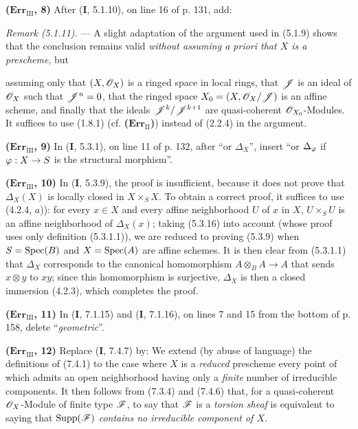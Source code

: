 \noindent\textbf{($\mathbf{Err}_{\mathrm{III}}$, 8)} After (\textbf{I}, 5.1.10), on
line 16 of p. 131, add:

\emph{Remark (5.1.11).} --- A slight adaptation of the argument used in
(5.1.9) shows that the conclusion remains valid \emph{without assuming a
priori that $X$ is a prescheme}, but

assuming only that $(X,\mathscr{O}_X)$ is a ringed space in local rings, that
$\mathscr{J}$ is an ideal of $\mathscr{O}_X$ such that $\mathscr{J}^n=0$, that the ringed
space $X_0=(X,\mathscr{O}_X/\mathscr{J})$ is an affine scheme, and finally that the
ideals $\mathscr{J}^k/\mathscr{J}^{k+1}$ are quasi-coherent $\mathscr{O}_{X_0}$-Modules. It
suffices to use (1.8.1) (cf. \textbf{($\mathbf{Err}_{\mathrm{II}}$)}) instead of
(2.2.4) in the argument.

\noindent\textbf{($\mathbf{Err}_{\mathrm{III}}$, 9)} In (\textbf{I}, 5.3.1), on line
11 of p. 132, after ``or $\Delta_X$'', insert ``or $\Delta_\varphi$ if
$\varphi:X\to S$ is the structural morphism''.

\noindent\textbf{($\mathbf{Err}_{\mathrm{III}}$, 10)} In (\textbf{I}, 5.3.9), the
proof is insufficient, because it does not prove that $\Delta_X(X)$ is
locally closed in $X\times_SX$. To obtain a correct proof, it suffices to use
(4.2.4, $a$)): for every $x\in X$ and every affine neighborhood $U$ of $x$ in
$X$, $U\times_SU$ is an affine neighborhood of $\Delta_X(x)$; taking (5.3.16)
into account (whose proof uses only definition (5.3.1.1)), we are reduced to
proving (5.3.9) when $S=\operatorname{Spec}(B)$ and $X=\operatorname{Spec}(A)$ are affine schemes. It is
then clear from (5.3.1.1) that $\Delta_X$ corresponds to the canonical
homomorphism $A\otimes_BA\to A$ that sends $x\otimes y$ to $xy$; since this
homomorphism is surjective, $\Delta_X$ is then a closed immersion (4.2.3),
which completes the proof.

\noindent\textbf{($\mathbf{Err}_{\mathrm{III}}$, 11)} In (\textbf{I}, 7.1.15) and
(\textbf{I}, 7.1.16), on lines 7 and 15 from the bottom of p. 158, delete
``\emph{geometric}''.

\noindent\textbf{($\mathbf{Err}_{\mathrm{III}}$, 12)} Replace (\textbf{I}, 7.4.7)
by: We extend (by abuse of language) the definitions of (7.4.1) to the case
where $X$ is a \emph{reduced} prescheme every point of which admits an open
neighborhood having only a \emph{finite} number of irreducible components. It
then follows from (7.3.4) and (7.4.6) that, for a quasi-coherent
$\mathscr{O}_X$-Module of finite type $\mathscr{F}$, to say that $\mathscr{F}$ is a
\emph{torsion sheaf} is equivalent to saying that $\operatorname{Supp}(\mathscr{F})$
\emph{contains no irreducible component of $X$}.

